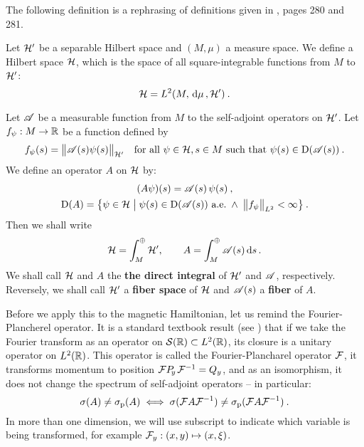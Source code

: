 The following definition is a rephrasing of definitions given in \cite{ReedSimon4}, pages 280 and 281.
\begin{defn}
    \label{defn-direct-integral}
    Let $\mathcal{H}'$ be a separable Hilbert space and $(M, \mu)$ a measure space. We define a Hilbert space $\mathcal{H}$, which is the space of all square-integrable functions from $M$ to $\mathcal{H}'$:
    \begin{equation*}
        \mathcal{H} = L^2(M, \, \mathrm{d}\mu \,, \mathcal{H}') \: .
    \end{equation*}

    Let $\mathscr{A}$ be a measurable function from $M$ to the self-adjoint operators on $\mathcal{H}'$. Let $f_\psi: M \to \mathbb{R}$ be a function defined by
    \begin{align*}
        f_\psi(s) = \big\lVert \mathscr{A}(s) \psi(s) \big\rVert_{\mathcal{H}'}
        \quad
        \text{for all } \psi \in \mathcal{H}, s \in M \text{ such that } \psi(s) \in \mathrm{D}(\mathscr{A}(s)) \: .
    \end{align*}
    We define an operator $A$ on $\mathcal{H}$ by:
    \begin{gather*}
        (A \psi)(s) = \mathscr{A}(s) \, \psi(s) \: , \\
        \mathrm{D}(A) = \big\{
            \psi \in \mathcal{H}
            \; \big| \;
            \psi(s) \in \mathrm{D}(\mathscr{A}(s)) \text{ a.e.}
            \; \wedge \;
            \big\lVert f_\psi \big\rVert_{L^2} < \infty
        \big\} \: .
    \end{gather*}
    Then we shall write
    \begin{gather*}
        \mathcal{H} = \int^\oplus_M \mathcal{H}', \qquad
        A = \int^\oplus_M \mathscr{A}(s) \, \mathrm{d}s \,.
    \end{gather*}
    We shall call $\mathcal{H}$ and $A$ the \textbf{the direct integral} of $\mathcal{H}'$ and $\mathscr{A}$, respectively. Reversely, we shall call $\mathcal{H}'$ a \textbf{fiber space} of $\mathcal{H}$ and $\mathscr{A}(s)$ a \textbf{fiber} of $A$.
\end{defn}

Before we apply this to the magnetic Hamiltonian, let us remind the Fourier-Plancherel operator. It is a standard textbook result (see \cite{BEH}) that if we take the Fourier transform as an operator on $\mathcal{S}(\mathbb{R}) \subset L^2(\mathbb{R})$, its closure is a unitary operator on $L^2(\mathbb{R})$. This operator is called the Fourier-Plancharel operator $\mathcal{F}$, it transforms momentum to position $\mathcal{F} P_{\!y\,} \mathcal{F}^{-1} = Q_y$, and as an isomorphism, it does not change the spectrum of self-adjoint operators – in particular:
\begin{equation*}
    \sigma(A) \neq \sigma_{\mathrm{p}}(A)
    \;\Longleftrightarrow\;
    \sigma(\mathcal{F} A \mathcal{F}^{-1}) \neq \sigma_{\mathrm{p}}(\mathcal{F} A \mathcal{F}^{-1})
    \: .
\end{equation*}
In more than one dimension, we will use subscript to indicate which variable is being transformed, for example $\mathcal{F}_y: (x,y) \mapsto (x,\xi)$.

